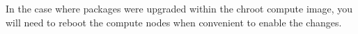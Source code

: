 \noindent In the case where packages were upgraded within the chroot compute image,
you will need to reboot the compute nodes when convenient to enable the
changes.

